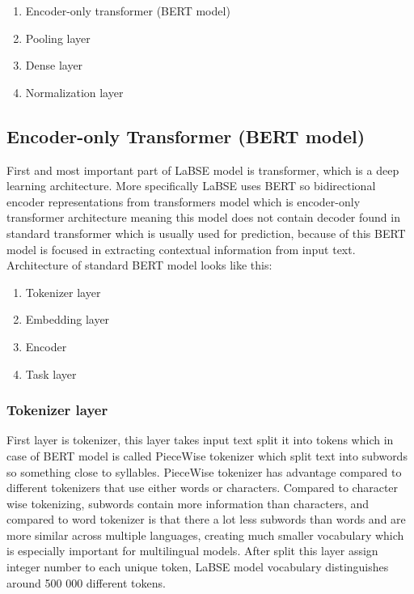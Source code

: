 \begin{enumerate}
	\item Encoder-only transformer (BERT model)
	\item Pooling layer
	\item Dense layer
	\item Normalization layer
\end{enumerate}

\subsection{Encoder-only Transformer (BERT model)}
\label{emb:trans}

First and most important part of LaBSE model is transformer, which is a deep learning architecture. More specifically LaBSE uses BERT so bidirectional encoder representations from transformers model which is encoder-only transformer architecture meaning this model does not contain decoder found in standard transformer which is usually used for prediction, because of this BERT model is focused in extracting contextual information from input text. Architecture of standard BERT model looks like this: 

\begin{enumerate}
	\item Tokenizer layer
	\item Embedding layer
	\item Encoder
	\item Task layer
\end{enumerate}

\subsubsection{Tokenizer layer}

First layer is tokenizer, this layer takes input text split it into tokens which in case of BERT model is called PieceWise tokenizer which split text into subwords so something close to syllables. PieceWise tokenizer has advantage compared to different tokenizers that use either words or characters. Compared to character wise tokenizing, subwords contain more information than characters, and compared to word tokenizer is that there a lot less subwords than words and are more similar across multiple languages, creating much smaller vocabulary which is especially important for multilingual models. After split this layer assign integer number to each unique token, LaBSE model vocabulary distinguishes around 500 000 different tokens.

